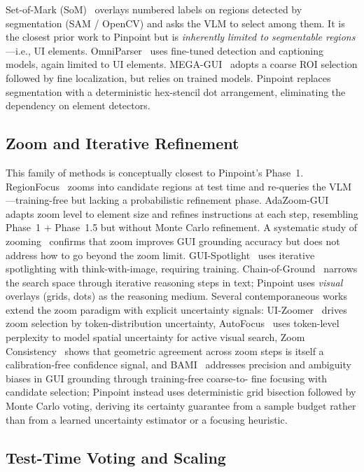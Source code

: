 \documentclass[sigconf,nonacm]{acmart}
\begin{document}
Set-of-Mark (SoM)~\cite{som} overlays numbered labels on regions
detected by segmentation (SAM / OpenCV) and asks the VLM to select
among them.  It is the closest prior work to Pinpoint but is
\emph{inherently limited to segmentable regions}---i.e., UI elements.
OmniParser~\cite{omniparser} uses fine-tuned detection and captioning
models, again limited to UI elements.
MEGA-GUI~\cite{megagui} adopts a coarse ROI selection followed by
fine localization, but relies on trained models.
Pinpoint replaces segmentation with a deterministic hex-stencil dot
arrangement, eliminating the dependency on element detectors.

\subsection{Zoom and Iterative Refinement}

This family of methods is conceptually closest to Pinpoint's Phase~1.
RegionFocus~\cite{regionfocus} zooms into candidate regions at test
time and re-queries the VLM---training-free but lacking a
probabilistic refinement phase.
AdaZoom-GUI~\cite{adazoom} adapts zoom level to element size and
refines instructions at each step, resembling Phase~1 + Phase~1.5
but without Monte Carlo refinement.
A systematic study of zooming~\cite{zooming-study} confirms that zoom
improves GUI grounding accuracy but does not address how to go beyond
the zoom limit.
GUI-Spotlight~\cite{gui-spotlight} uses iterative spotlighting with
think-with-image, requiring training.
Chain-of-Ground~\cite{chain-of-ground} narrows the search space
through iterative reasoning steps in text; Pinpoint uses \emph{visual}
overlays (grids, dots) as the reasoning medium.
Several contemporaneous works extend the zoom paradigm with explicit
uncertainty signals: UI-Zoomer~\cite{tang2026uizoomer} drives zoom
selection by token-distribution uncertainty,
AutoFocus~\cite{yao2026autofocus} uses token-level perplexity to
model spatial uncertainty for active visual search, Zoom
Consistency~\cite{kim2026zoomconsistency} shows that geometric
agreement across zoom steps is itself a calibration-free confidence
signal, and BAMI~\cite{zhang2026bami} addresses precision and
ambiguity biases in {GUI} grounding through training-free coarse-to-
fine focusing with candidate selection; Pinpoint instead uses
deterministic grid bisection followed by Monte Carlo voting, deriving
its certainty guarantee from a sample budget rather than from a
learned uncertainty estimator or a focusing heuristic.

\subsection{Test-Time Voting and Scaling}
\end{document}

